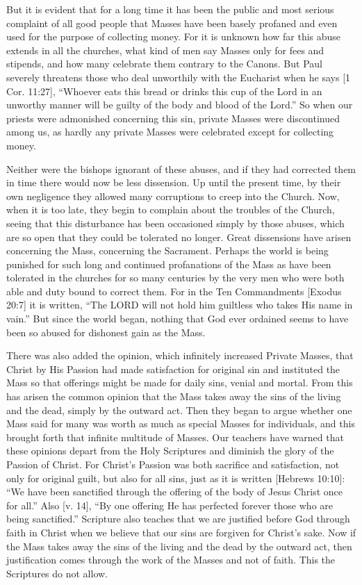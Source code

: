 But it is evident that for a long time it has been the public and most serious complaint of all good people that Masses have been basely profaned and even used for the purpose of collecting money. For it is unknown how far this abuse extends in all the churches, what kind of men say Masses only for fees and stipends, and how many celebrate them contrary to the Canons. But Paul severely threatens those who deal unworthily with the Eucharist when he says [1 Cor. 11:27], “Whoever eats this bread or drinks this cup of the Lord in an unworthy manner will be guilty of the body and blood of the Lord.” So when our priests were admonished concerning this sin, private Masses were discontinued among us, as hardly any private Masses were celebrated except for collecting money.

Neither were the bishops ignorant of these abuses, and if they had corrected them in time there would now be less dissension. Up until the present time, by their own negligence they allowed many corruptions to creep into the Church. Now, when it is too late, they begin to complain about the troubles of the Church, seeing that this disturbance has been occasioned simply by those abuses, which are so open that they could be tolerated no longer. Great dissensions have arisen concerning the Mass, concerning the Sacrament. Perhaps the world is being punished for such long and continued profanations of the Mass as have been tolerated in the churches for so many centuries by the very men who were both able and duty bound to correct them. For in the Ten Commandments [Exodus 20:7] it is written, “The LORD will not hold him guiltless who takes His name in vain.” But since the world began, nothing that God ever ordained seems to have been so abused for dishonest gain as the Mass.

There was also added the opinion, which infinitely increased Private Masses, that Christ by His Passion had made satisfaction for original sin and instituted the Mass so that offerings might be made for daily sins, venial and mortal. From this has arisen the common opinion that the Mass takes away the sins of the living and the dead, simply by the outward act. Then they began to argue whether one Mass said for many was worth as much as special Masses for individuals, and this brought forth that infinite multitude of Masses. Our teachers have warned that these opinions depart from the Holy Scriptures and diminish the glory of the Passion of Christ. For Christ’s Passion was both sacrifice and satisfaction, not only for original guilt, but also for all sins, just as it is written [Hebrews 10:10]: “We have been sanctified through the offering of the body of Jesus Christ once for all.” Also [v. 14], “By one offering He has perfected forever those who are being sanctified.” Scripture also teaches that we are justified before God through faith in Christ when we believe that our sins are forgiven for Christ’s sake. Now if the Mass takes away the sins of the living and the dead by the outward act, then justification comes through the work of the Masses and not of faith. This the Scriptures do not allow.

